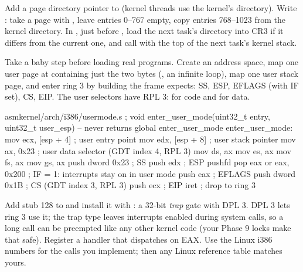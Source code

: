 \documentclass[11pt,a4paper]{article}
\begin{document}
Add a page directory pointer to  (kernel threads use the kernel's directory). Write
: take a page with , leave entries 0--767 empty, copy entries
768--1023 from the kernel directory. In , just before , load the next task's
directory into CR3 if it differs from the current one, and call  with the top of the next
task's kernel stack.

Take a baby step before loading real programs. Create an address space, map one user page at 
containing just the two bytes  (, an infinite loop), map one user stack page, and enter ring 3
by building the frame  expects: SS, ESP, EFLAGS (with IF set), CS, EIP. The user selectors have RPL 3:
 for code and  for data.

\begin{lst}{asm}{kernel/arch/i386/usermode.s}
; void enter_user_mode(uint32_t entry, uint32_t user_esp)   -- never returns
global enter_user_mode
enter_user_mode:
    mov  ecx, [esp + 4]     ; user entry point
    mov  edx, [esp + 8]     ; user stack pointer
    mov  ax, 0x23           ; user data selector (GDT index 4, RPL 3)
    mov  ds, ax
    mov  es, ax
    mov  fs, ax
    mov  gs, ax
    push dword 0x23         ; SS
    push edx                ; ESP
    pushfd
    pop  eax
    or   eax, 0x200         ; IF = 1: interrupts stay on in user mode
    push eax                ; EFLAGS
    push dword 0x1B         ; CS (GDT index 3, RPL 3)
    push ecx                ; EIP
    iret                    ; drop to ring 3
\end{lst}

Add stub 128 to  and install it with : a 32-bit
\emph{trap} gate with DPL 3. DPL 3 lets ring 3 use it; the trap type leaves interrupts enabled during system calls,
so a long call can be preempted like any other kernel code (your Phase 9 locks make that safe). Register a handler
that dispatches on EAX. Use the Linux i386 numbers for the calls you implement; then any Linux reference table
matches yours.
\end{document}

